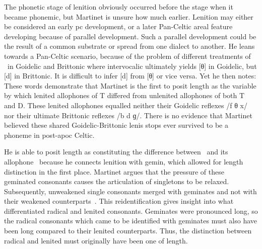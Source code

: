 The phonetic stage of lenition obviously occurred before the stage when it became phonemic, but Martinet is unsure how much earlier. Lenition may either be considered an early \acrlong{pc} development, or a later Pan-Celtic areal feature developing because of parallel development. Such a parallel development could be the result of a common substrate or spread from one dialect to another. He leans towards a Pan-Celtic scenario, because of the problem of different treatments of \lT\ in Goidelic and Brittonic where intervocalic  ultimately yields [θ] in Goidelic, but [d] in Brittonic. It is difficult to infer [d] from [θ] or vice versa. Yet he then notes:
These words demonstrate that Martinet is the first to posit length as the variable by which lenited allophones of \gls{T} differed from unlenited allophones of both \gls{T} and \gls{D}. These lenited allophones equalled neither their Goidelic reflexes /f θ x/ nor their ultimate Brittonic reflexes /b d ɡ/. There is no evidence that Martinet believed these shared Goidelic-Brittonic lenis stops ever survived to be a phoneme in post-\gls{apoc} Celtic.

He is able to posit length as constituting the difference between \xT\ and its allophone \lT\  because he connects lenition with \gls{gemin}, which allowed for length distinction in the first place. Martinet argues that  the pressure of these geminated consonants causes the articulation of singletons to be relaxed. Subsequently, unweakened single consonants merged with geminates and not with their weakened counterparts~\autocite[212]{martinet_celtic_1952}. This reidentification gives insight into what differentiated  radical and lenited consonants. Geminates were pronounced long, so the radical consonants which came to be identified with geminates must also have been long compared to their lenited counterparts. Thus, the distinction between radical and lenited must originally have been one of length.


